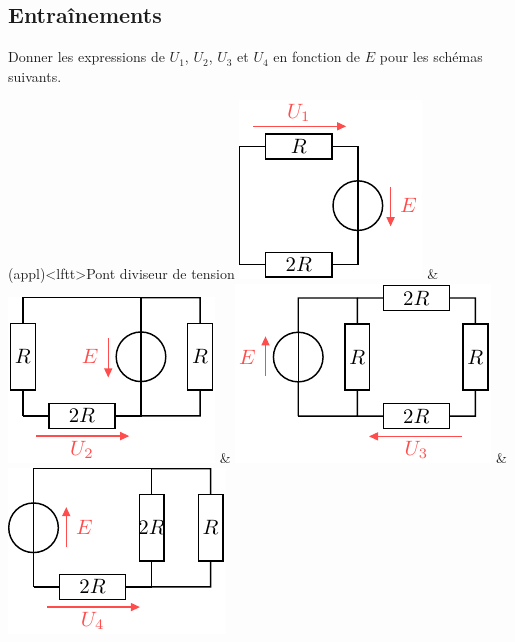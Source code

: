 \documentclass[../../main/main.tex]{subfiles}
\begin{document}
\subsection{Entraînements}
Donner les expressions de $U_1$, $U_2$, $U_3$ et $U_4$ en fonction de $E$
pour les schémas suivants.
\begin{tcb}[tabularx={Y|Y|Y|Y}](appl)<lftt>{Pont diviseur de tension}
	\vspace{12pt}
	\includegraphics[scale=1]{pdt_a-plain}
	&
	\vspace{12pt}
	\includegraphics[scale=1]{pdt_b-plain}
	&
	\vspace{12pt}
	\includegraphics[scale=1]{pdt_c-plain}
	&
	\vspace{12pt}
	\includegraphics[scale=1]{pdt_d-plain}

\end{tcb}
\end{document}
